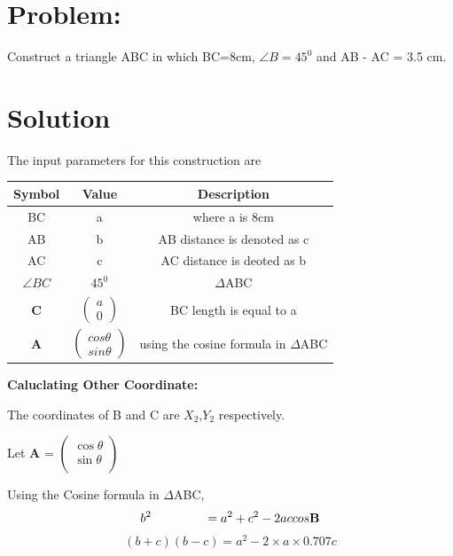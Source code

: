 \documentclass[10pt,a4paper]{report}
\newcommand{\myvec}[1]{\ensuremath{\begin{pmatrix}#1\end{pmatrix}}}
\let\vec\mathbf
\begin{document}
\begin{multicols}{2}
\section{Problem:}  Construct a triangle ABC in which BC=8cm, $\angle{B}=45^0$ and AB - AC = 3.5 cm.\vspace{3mm}
\section{Solution}
The input parameters for this construction are
\begin{center}
\begin{tabular}{|c|c|c|}
  \hline
  \textbf{Symbol}&\textbf{Value}&\textbf{Description}\\
  \hline
  BC & a & where a is 8cm\\
  \hline
  AB & b & AB distance is denoted as c \\
  \hline 
  AC & c & AC distance is deoted as b \\
  \hline
  $\angle{BC}$ & $45^0$ &  $\Delta$ABC \\
  \hline
  $\vec{C}$ & $\myvec{a\\0}$ & BC length is equal to a\\
  \hline
  $\vec{A}$ & $\myvec{ cos\theta \\ sin\theta}$ & using the cosine formula in $\Delta$ABC\\
  \hline
\end{tabular}
\end{center}
\raggedright\textbf{Caluclating Other Coordinate: } \\
\raggedright The coordinates of B and C are $X_{2}$,$Y_{2}$ respectively. \\
  \raggedright Let \textbf{A} =
  $\begin{pmatrix} 
 \cos \theta\\
  \sin\theta \\
\end{pmatrix}$ \\
\raggedright Using the Cosine formula in  $\Delta$ABC, \\ \vspace{3mm}
\begin{equation}
{b}^2\hspace{1.5cm}= {a}^2 + {c}^2 - 2accos\vec{B}
\end{equation}
\begin{equation}
(b+c)(b-c) = {a}^2- 2 \times a \times 0.707c
\end{equation}

\end{multicols}
\end{document}
